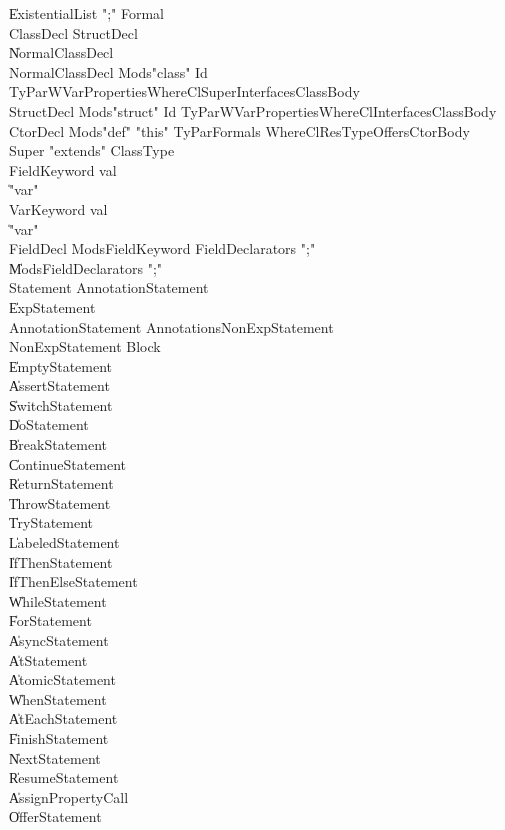 {\begin{grammar}
    \| ExistentialList \xcd";" Formal\\
 ClassDecl  \: StructDecl\\
    \| NormalClassDecl\\
 NormalClassDecl  \: Mods\opt \xcd"class" Id TyParWVar\opt Properties\opt WhereCl\opt Super\opt Interfaces\opt ClassBody\\
 StructDecl  \: Mods\opt \xcd"struct" Id TyParWVar\opt Properties\opt WhereCl\opt Interfaces\opt ClassBody\\
 CtorDecl  \: Mods\opt \xcd"def" \xcd"this" TyPar\opt Formals WhereCl\opt ResType\opt Offers\opt CtorBody\\
 Super  \: \xcd"extends" ClassType\\
 FieldKeyword  \: val\\
    \| \xcd"var"\\
 VarKeyword  \: val\\
    \| \xcd"var"\\
 FieldDecl  \: Mods\opt FieldKeyword FieldDeclarators \xcd";"\\
    \| Mods\opt FieldDeclarators \xcd";"\\
 Statement  \: AnnotationStatement\\
    \| ExpStatement\\
 AnnotationStatement  \: Annotations\opt NonExpStatement\\
 NonExpStatement  \: Block\\
    \| EmptyStatement\\
    \| AssertStatement\\
    \| SwitchStatement\\
    \| DoStatement\\
    \| BreakStatement\\
    \| ContinueStatement\\
    \| ReturnStatement\\
    \| ThrowStatement\\
    \| TryStatement\\
    \| LabeledStatement\\
    \| IfThenStatement\\
    \| IfThenElseStatement\\
    \| WhileStatement\\
    \| ForStatement\\
    \| AsyncStatement\\
    \| AtStatement\\
    \| AtomicStatement\\
    \| WhenStatement\\
    \| AtEachStatement\\
    \| FinishStatement\\
    \| NextStatement\\
    \| ResumeStatement\\
    \| AssignPropertyCall\\
    \| OfferStatement\\
\end{grammar}

}
